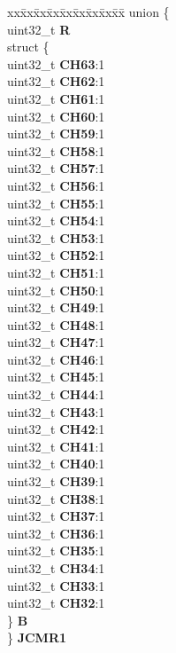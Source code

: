 \begin{DoxyCompactItemize}
\begin{tabbing}
\end{tabbing}\item 
\mbox{\label{structADC__tag_ad9924fee6a27b491c2623f7946b213cc}} 
\begin{tabbing}
xx\=xx\=xx\=xx\=xx\=xx\=xx\=xx\=xx\=\kill
union \{\\
\>uint32\_t {\bfseries R}\\
\>struct \{\\
\>\>uint32\_t {\bfseries CH63}:1\\
\>\>uint32\_t {\bfseries CH62}:1\\
\>\>uint32\_t {\bfseries CH61}:1\\
\>\>uint32\_t {\bfseries CH60}:1\\
\>\>uint32\_t {\bfseries CH59}:1\\
\>\>uint32\_t {\bfseries CH58}:1\\
\>\>uint32\_t {\bfseries CH57}:1\\
\>\>uint32\_t {\bfseries CH56}:1\\
\>\>uint32\_t {\bfseries CH55}:1\\
\>\>uint32\_t {\bfseries CH54}:1\\
\>\>uint32\_t {\bfseries CH53}:1\\
\>\>uint32\_t {\bfseries CH52}:1\\
\>\>uint32\_t {\bfseries CH51}:1\\
\>\>uint32\_t {\bfseries CH50}:1\\
\>\>uint32\_t {\bfseries CH49}:1\\
\>\>uint32\_t {\bfseries CH48}:1\\
\>\>uint32\_t {\bfseries CH47}:1\\
\>\>uint32\_t {\bfseries CH46}:1\\
\>\>uint32\_t {\bfseries CH45}:1\\
\>\>uint32\_t {\bfseries CH44}:1\\
\>\>uint32\_t {\bfseries CH43}:1\\
\>\>uint32\_t {\bfseries CH42}:1\\
\>\>uint32\_t {\bfseries CH41}:1\\
\>\>uint32\_t {\bfseries CH40}:1\\
\>\>uint32\_t {\bfseries CH39}:1\\
\>\>uint32\_t {\bfseries CH38}:1\\
\>\>uint32\_t {\bfseries CH37}:1\\
\>\>uint32\_t {\bfseries CH36}:1\\
\>\>uint32\_t {\bfseries CH35}:1\\
\>\>uint32\_t {\bfseries CH34}:1\\
\>\>uint32\_t {\bfseries CH33}:1\\
\>\>uint32\_t {\bfseries CH32}:1\\
\>\} {\bfseries B}\\
\} {\bfseries JCMR1}\\


\end{tabbing}
\end{DoxyCompactItemize}

